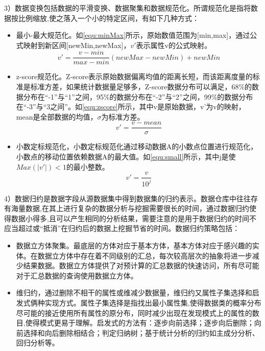   3）数据变换包括数据的平滑变换、数据聚集和数据规范化。所谓规范化是指将数据按比例缩放,使之落入一个小的特定区间，有如下几种方式：
  \begin{itemize}
  \item 最小-最大规范化。如\autoref{equ:minMax}所示，原始数值范围为[min,max]，通过公式映射到新区间[newMin,newMax]，$v'$表示属性v的公式映射。
  \begin{equation}
    v' = \frac{v-min}{max-min}(newMax-newMin)+newMin
    \label{equ:minMax}
  \end{equation}
  \item z-score规范化。Z-score表示原始数据偏离均值的距离长短，而该距离度量的标准是标准方差，如果统计数据量足够多，Z-score数据分布可以满足，68\%的数据分布在“-1”与“1”之间，95\%的数据分布在“-2”与“2”之间，99\%的数据分布在“-3”与“3之间”。如\autoref{equ:zscore}所示，其中v是原始数据，v'为v的映射，mean是全部数据的均值，$\sigma$为标准方差。
  \begin{equation}
    v' = \frac{v-mean}{\sigma}
    \label{equ:zscore}
  \end{equation}
  \item 小数定标规范化，小数定标规范化通过移动数据A的小数点位置进行规范化，小数点的移动位置依赖数据A的最大值。如\autoref{equ:small}所示，其中j是使$Max(| v'|)<1$的最小整数。
  \begin{equation}
    v' = \frac{v}{10^j}
    \label{equ:small}
  \end{equation}
  \end{itemize} 

  4）数据归约是数据字段从源数据集中得到数据集的归约表示。数据仓库中往往存有海量数据,在其上进行复杂的数据分析与挖掘需要很长的时间，通过数据归约使得数据小得多,且可以产生相同的分析结果，需要注意的是用于数据归约的时间不应当超过或“抵消”在归约后的数据上挖掘节省的时间。数据归约策略包括：
  \begin{itemize}
  \item 数据立方体聚集。最底层的方体对应于基本方体，基本方体对应于感兴趣的实体。在数据立方体中存在着不同级别的汇总，每次较高层次的抽象将进一步减少结果数据。数据立方体提供了对预计算的汇总数据的快速访问，所有尽可能对于汇总数据的查询使用数据立方体。
  \item 维归约，通过删除不相干的属性或维减少数据量，维归约又属性子集选择和启发式俩种实现方式。属性子集选择是指找出最小属性集,使得数据类的概率分布尽可能的接近使用所有属性的原分布，同时减少出现在发现模式上的属性的数目,使得模式更易于理解。启发式的方法有：逐步向前选择；逐步向后删除；向前选择和向后删除相结合；判定归纳树；基于统计分析的归约如主成分分析、回归分析等。
  \end{itemize}

